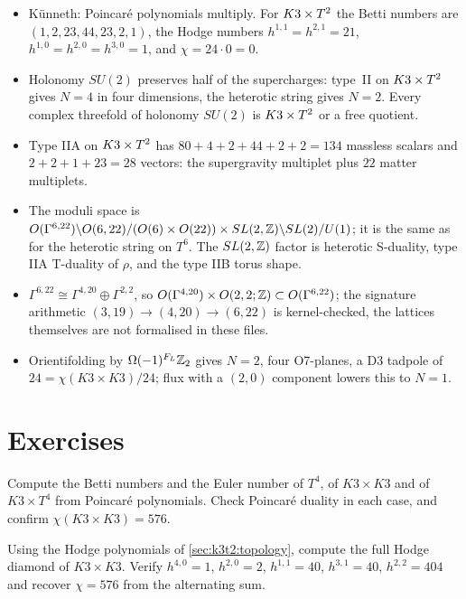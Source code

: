 \begin{summarybox}
\begin{itemize}[leftmargin=*]
 \item K\"unneth: Poincar\'e polynomials multiply. For $K3\times T^2$ the Betti numbers are
 $(1,2,23,44,23,2,1)$, the Hodge numbers $h^{1,1}=h^{2,1}=21$, $h^{1,0}=h^{2,0}=h^{3,0}=1$,
 and $\chi=24\cdot0=0$.
 \item Holonomy $SU(2)$ preserves half of the supercharges: type~II on $K3\times T^2$ gives $N=4$ in
 four dimensions, the heterotic string gives $N=2$. Every complex threefold of holonomy
 $SU(2)$ is $K3\times T^2$ or a free quotient.
 \item Type IIA on $K3\times T^2$ has $80+4+2+44+2+2=134$ massless scalars and $2+2+1+23=28$ vectors:
 the supergravity multiplet plus $22$ matter multiplets.
 \item The moduli space is $O(\Gamma^{6,22})\backslash O(6,22)/(O(6)\times O(22))\times
 SL(2,\mathbb{Z})\backslash SL(2)/U(1)$; it is the same as for the heterotic string on $T^6$. The $SL(2,\mathbb{Z})$
 factor is heterotic S-duality, type IIA T-duality of $\rho$, and the type IIB torus shape.
 \item $\Gamma^{6,22}\cong\Gamma^{4,20}\oplus\Gamma^{2,2}$, so
 $O(\Gamma^{4,20})\times O(2,2;\mathbb{Z})\subset O(\Gamma^{6,22})$; the signature arithmetic
 $(3,19)\to(4,20)\to(6,22)$ is kernel-checked, the lattices themselves are not formalised
 in these files.
 \item Orientifolding by $\Omega(-1)^{F_L}\mathbb{Z}_2$ gives $N=2$, four O7-planes, a D3 tadpole
 of $24=\chi(K3\times K3)/24$; flux with a $(2,0)$ component lowers this to $N=1$.
\end{itemize}
\end{summarybox}

\section*{Exercises}

\begin{exercise}[$\star$]\label{exe:k3t2:t4}
Compute the Betti numbers and the Euler number of $T^4$, of $K3\times K3$ and of
$K3\times T^4$ from Poincar\'e polynomials. Check Poincar\'e duality in each case, and
confirm $\chi(K3\times K3)=576$.
\end{exercise}

\begin{exercise}[$\star$]
Using the Hodge polynomials of \cref{sec:k3t2:topology}, compute the full Hodge diamond of
$K3\times K3$. Verify $h^{4,0}=1$, $h^{2,0}=2$, $h^{1,1}=40$, $h^{3,1}=40$, $h^{2,2}=404$ and
recover $\chi=576$ from the alternating sum.
\end{exercise}

